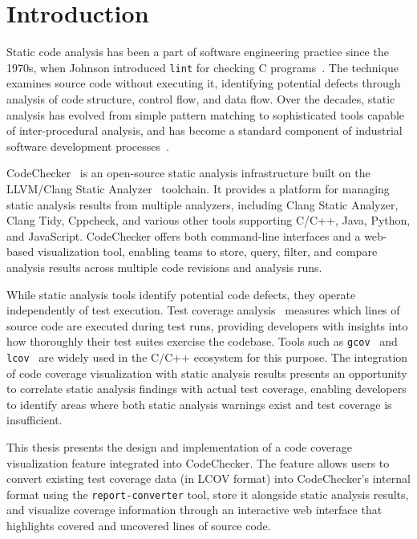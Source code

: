 \chapter{Introduction}
\label{ch:intro}

Static code analysis has been a part of software engineering practice since the 1970s, when Johnson introduced \texttt{lint} for checking C programs~\cite{johnson1977lint}. The technique examines source code without executing it, identifying potential defects through analysis of code structure, control flow, and data flow. Over the decades, static analysis has evolved from simple pattern matching to sophisticated tools capable of inter-procedural analysis, and has become a standard component of industrial software development processes~\cite{bessey2010coverity}.

CodeChecker~\cite{codechecker} is an open-source static analysis infrastructure built on the LLVM/Clang Static Analyzer~\cite{clangsa} toolchain. It provides a platform for managing static analysis results from multiple analyzers, including Clang Static Analyzer, Clang Tidy, Cppcheck, and various other tools supporting C/C++, Java, Python, and JavaScript. CodeChecker offers both command-line interfaces and a web-based visualization tool, enabling teams to store, query, filter, and compare analysis results across multiple code revisions and analysis runs.

While static analysis tools identify potential code defects, they operate independently of test execution. Test coverage analysis~\cite{yang2009coverage} measures which lines of source code are executed during test runs, providing developers with insights into how thoroughly their test suites exercise the codebase. Tools such as \texttt{gcov}~\cite{gcov} and \texttt{lcov}~\cite{lcov} are widely used in the C/C++ ecosystem for this purpose. The integration of code coverage visualization with static analysis results presents an opportunity to correlate static analysis findings with actual test coverage, enabling developers to identify areas where both static analysis warnings exist and test coverage is insufficient.

This thesis presents the design and implementation of a code coverage visualization feature integrated into CodeChecker. The feature allows users to convert existing test coverage data (in LCOV format) into CodeChecker's internal format using the \texttt{report-converter} tool, store it alongside static analysis results, and visualize coverage information through an interactive web interface that highlights covered and uncovered lines of source code.

